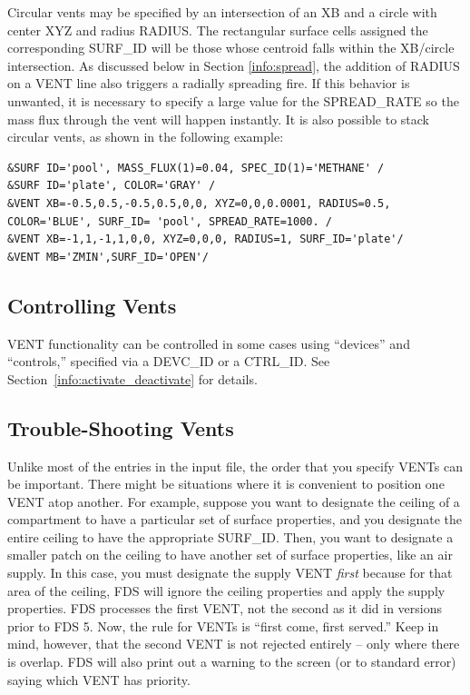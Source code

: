 \documentclass[11pt]{book}
\begin{document}
Circular vents may be specified by an intersection of an {\ct XB} and a circle with center {\ct XYZ} and radius {\ct RADIUS}.  The rectangular surface cells assigned the corresponding {\ct SURF\_ID} will be those whose centroid falls within the {\ct XB}/circle intersection. As discussed below in Section \ref{info:spread}, the addition of {\ct RADIUS} on a {\ct VENT} line also triggers a radially spreading fire.  If this behavior is unwanted, it is necessary to specify a large value for the {\ct SPREAD\_RATE} so the mass flux through the vent will happen instantly.  It is also possible to stack circular vents, as shown in the following example:

\begin{lstlisting}
&SURF ID='pool', MASS_FLUX(1)=0.04, SPEC_ID(1)='METHANE' /
&SURF ID='plate', COLOR='GRAY' /
&VENT XB=-0.5,0.5,-0.5,0.5,0,0, XYZ=0,0,0.0001, RADIUS=0.5, COLOR='BLUE', SURF_ID= 'pool', SPREAD_RATE=1000. /
&VENT XB=-1,1,-1,1,0,0, XYZ=0,0,0, RADIUS=1, SURF_ID='plate'/
&VENT MB='ZMIN',SURF_ID='OPEN'/
\end{lstlisting}


\subsection{Controlling Vents}

{\ct VENT} functionality can be controlled in some cases using ``devices'' and ``controls,'' specified via a {\ct DEVC\_ID} or a {\ct CTRL\_ID}.
See Section~\ref{info:activate_deactivate} for details.

\subsection{Trouble-Shooting Vents}
\label{info:VENT_Trouble}

Unlike most of the entries in the input file, the order that you specify {\ct VENT}s can be important. There might be
situations where it is convenient to position one {\ct VENT} atop another. For example, suppose you want to designate the
ceiling of a compartment to have a particular set of surface properties, and you designate the entire ceiling to have the
appropriate {\ct SURF\_ID}. Then, you want to designate a smaller patch on the ceiling to have another set of surface
properties, like an air supply. In this case, you must designate the supply {\ct VENT} {\em first} because for that area
of the ceiling, FDS will ignore the ceiling properties and apply the supply properties. FDS processes the first {\ct VENT}, not
the second as it did in versions prior to FDS 5. Now, the rule for {\ct VENT}s is ``first come, first served.''
Keep in mind, however, that the
second {\ct VENT} is not rejected entirely -- only where there is overlap. FDS will also print out a warning to the screen (or to
standard error) saying which {\ct VENT} has priority.
\end{document}
